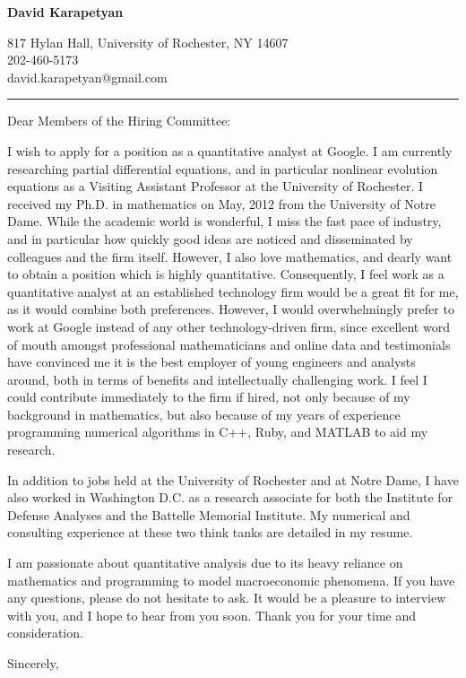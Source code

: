 \documentclass[12pt]{letter}
\date{\vspace{0.5cm}\flushleft}
\begin{document}
\begin{letter}{}
\begin{center}
{\bf {\Large David Karapetyan}}
\end{center}

\begin{center}
{817 Hylan Hall, University of Rochester, NY 14607  \\ 
202-460-5173 \\  david.karapetyan@gmail.com
}
\end{center}
\hrule

\opening{Dear Members of the Hiring Committee:\\}
%

%
I wish to apply for a position as a quantitative analyst at Google. I am currently researching partial differential equations, and in particular nonlinear
evolution equations as a Visiting Assistant Professor at the University of
Rochester. I received my Ph.D. in mathematics on May, 2012 from the University
of Notre Dame. While the academic world is wonderful, I miss the fast pace of
industry, and in particular how quickly good ideas are noticed and disseminated by colleagues and the firm itself. However, I also love mathematics, and dearly want to obtain
a position which is highly quantitative. Consequently, I feel work as a
quantitative analyst at an established technology firm would be a great fit for
me, as it would combine both preferences. However, I would overwhelmingly
prefer to work at Google instead of any other technology-driven firm, since
excellent word of mouth amongst professional mathematicians and online data and
testimonials have convinced me it is the best employer of young engineers and
analysts around, both in terms of benefits and intellectually challenging work.
I feel I could contribute immediately to the firm if hired, not only because of
my background in mathematics, but also because of my years of experience
programming numerical algorithms in C++, Ruby, and MATLAB to aid my research.

In addition to jobs held at the University of Rochester and at Notre Dame, I have
also worked in Washington D.C. as a research associate for both the Institute
for Defense Analyses and the Battelle Memorial Institute. My numerical and
consulting experience at these two think tanks are detailed in my resume. 

I am passionate about quantitative analysis due to its heavy reliance on mathematics and programming to model macroeconomic phenomena. If you have any questions, please do not hesitate to ask. It would be a
pleasure to interview with you, and I hope to hear from you soon. Thank you for
your time and consideration. 

\closing{Sincerely,}


\end{letter}
\end{document}
